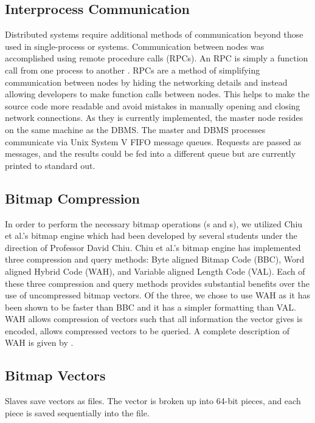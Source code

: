 \subsection{Interprocess Communication}
Distributed systems require additional methods of communication beyond those
used in single-process or systems. Communication between nodes
was accomplished using remote procedure calls (RPCs). An RPC is simply a
function call from one process to another \cite{tanenbaum1994}. RPCs are a
method of simplifying communication between nodes by hiding the networking
details and instead allowing developers to make function calls between nodes.
This helps to make the source code more readable and avoid mistakes in manually
opening and closing network connections. As they is currently implemented, the master node
resides on the same machine as the DBMS. The master and DBMS processes
communicate via Unix System V FIFO message queues. Requests are passed
as messages, and the results could be fed into a different queue but are
currently printed to standard out.
%
\subsection{Bitmap Compression}
In order to perform the necessary bitmap operations (s and
s), we utilized Chiu et al.'s bitmap engine which had been developed
by several students under the direction of Professor David Chiu. Chiu et al.'s
bitmap engine has implemented three compression and query methods: Byte aligned
Bitmap Code (BBC), Word aligned Hybrid Code (WAH), and Variable aligned Length
Code (VAL). Each of these three compression and query methods provides
substantial benefits over the use of uncompressed bitmap vectors. Of the three,
we chose to use WAH as it has been shown to be faster than BBC and it has a
simpler formatting than VAL. WAH allows compression of vectors such that all
information the vector gives is encoded, allows compressed vectors to be
queried. A complete description of WAH is given by \cite{wu2001}.
\subsection{Bitmap Vectors}
Slaves save vectors as files. The vector is broken up into 64-bit pieces, and
each piece is saved sequentially into the file.
%
